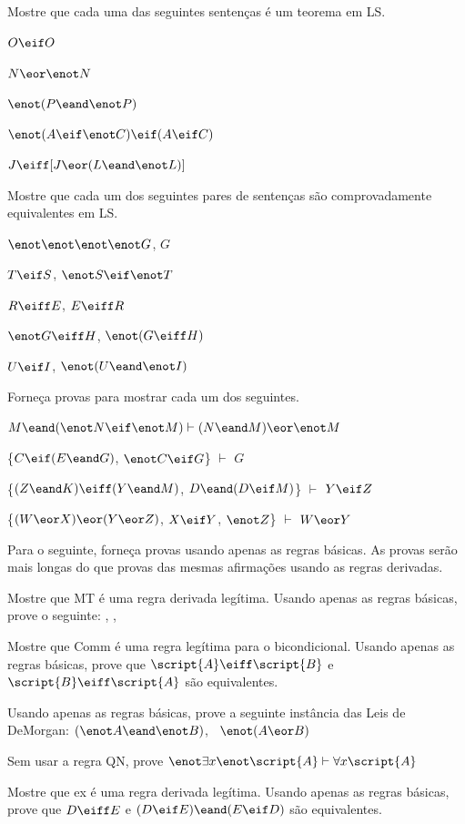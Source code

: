 \problempart
Mostre que cada uma das seguintes sentenças é um teorema em LS.
\begin{earg}
\item $O \eif O$
\item $N \eor \enot N$
\item $\enot(P\eand \enot P)$
\item $\enot(A \eif \enot C) \eif (A \eif C)$
\item $J \eiff [J\eor (L\eand\enot L)]$
\end{earg}

\problempart
Mostre que cada um dos seguintes pares de sentenças são comprovadamente equivalentes em LS.
\begin{earg}
\item $\enot\enot\enot\enot G$, $G$
\item $T\eif S$, $\enot S \eif \enot T$
\item $R \eiff E$, $E \eiff R$
\item $\enot G \eiff H$, $\enot(G \eiff H)$
\item $U \eif I$, $\enot(U \eand \enot I)$
\end{earg}

\problempart
Forneça provas para mostrar cada um dos seguintes.
\begin{earg}
\item $M \eand (\enot N \eif \enot M) \vdash (N \eand M) \eor \enot M$
\item \{$C\eif(E\eand G)$, $\enot C \eif G$\} $\vdash$ $G$
\item \{$(Z\eand K)\eiff(Y\eand M)$, $D\eand(D\eif M)$\} $\vdash$ $Y\eif Z$
\item \{$(W \eor X) \eor (Y \eor Z)$, $X\eif Y$, $\enot Z$\} $\vdash$ $W\eor Y$
\end{earg}



\problempart
Para o seguinte, forneça provas usando apenas as regras básicas. As provas serão mais longas do que provas das mesmas afirmações usando as regras derivadas.
\begin{earg}
\item Mostre que MT é uma regra derivada legítima. Usando apenas as regras básicas, prove o seguinte: \eif{}, \enot{}, \therefore\ \enot{}
\item Mostre que Comm é uma regra legítima para o bicondicional. Usando apenas as regras básicas, prove que $\script{A}\eiff\script{B}$ e $\script{B}\eiff\script{A}$ são equivalentes.
\item Usando apenas as regras básicas, prove a seguinte instância das Leis de DeMorgan: $(\enot A \eand \enot B)$, \therefore\ $\enot(A \eor B)$
\item Sem usar a regra QN, prove $\enot\exists x\enot\script{A} \vdash \forall x\script{A}$
\item Mostre que {\eiff}{ex} é uma regra derivada legítima. Usando apenas as regras básicas, prove que $D\eiff E$ e $(D\eif E)\eand(E\eif D)$ são equivalentes.
\end{earg}


